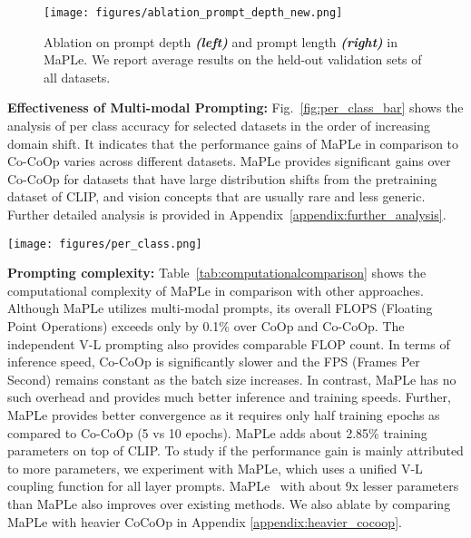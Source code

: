 \documentclass[10pt,twocolumn,letterpaper]{article}
\begin{document}
\begin{figure}[!b]
\texttt{[image: figures/ablation\_prompt\_depth\_new.png]}
\caption{\small Ablation on prompt depth  \emph{\textbf{(left)}} and prompt length \emph{\textbf{(right)}} in MaPLe. We report average results on the held-out validation sets of all datasets.}
  \label{fig:ablation1}
\end{figure}

\noindent\textbf{Effectiveness of Multi-modal Prompting:}
Fig.~\ref{fig:per_class_bar} shows the analysis of per class accuracy for selected datasets in the order of increasing domain shift. It indicates that the performance gains of MaPLe in comparison to Co-CoOp varies across different datasets. MaPLe provides significant gains over Co-CoOp for datasets that have large distribution shifts from the pretraining dataset of CLIP, and vision concepts that are usually rare and less generic. Further detailed analysis is provided in Appendix~\ref{appendix:further_analysis}.

\begin{SCfigure}[][!t]
\centering
    \texttt{[image: figures/per\_class.png]}
  \caption{\protect \small Percentage classes where MaPLe shows improved performance over Co-CoOp, which increases as dataset domain shift from generic categories increases ().}
  \label{fig:per_class_bar}
  \vspace{-0.1in}
\end{SCfigure}

\noindent \textbf{Prompting complexity:}
Table~\ref{tab:computationalcomparison} shows the computational complexity of MaPLe in comparison with other approaches. Although MaPLe utilizes multi-modal prompts, its overall FLOPS (Floating Point Operations) exceeds only by 0.1\% over CoOp and Co-CoOp. The independent V-L prompting also provides comparable FLOP count. In terms of inference speed, Co-CoOp is significantly slower and the FPS (Frames Per Second) remains constant as the batch size increases. In contrast, MaPLe has no such overhead and provides much better inference and training speeds. Further, MaPLe provides better convergence as it requires only half training epochs as compared to Co-CoOp (5 vs 10 epochs). MaPLe adds about 2.85\% training parameters on top of CLIP. To study if the performance gain is mainly attributed to more parameters, we experiment with MaPLe\dag, which uses a unified V-L coupling function for all layer prompts. MaPLe\dag~ with about 9x lesser parameters than MaPLe also improves over existing methods. We also ablate by comparing MaPLe with heavier CoCoOp in Appendix \ref{appendix:heavier_cocoop}.
\end{document}
